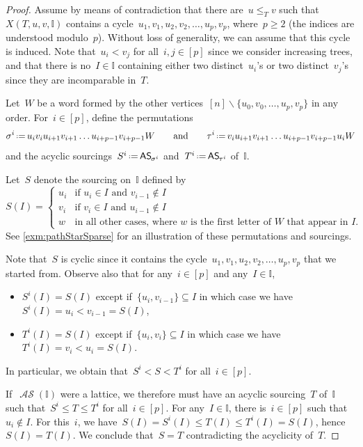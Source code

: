\documentclass{amsart}
\theoremstyle{definition}
\newcommand{\ssm}{\smallsetminus} %
\newcommand{\eqdef}{\mbox{\,\raisebox{0.2ex}{\scriptsize\ensuremath{\mathrm:}}\ensuremath{=}\,}} %
\newcommand{\mymap}[2]{\mathsf{#1}_{\hspace{-.7pt}#2}}
\DeclareMathOperator{\ASour}{\mathcal{AS}}  %
\newcommand{\asour}[1]{\mymap{AS}{#1}}  %
\newcommand{\II}{\mathbb I} %
\begin{document}
\begin{proof}
Assume by means of contradiction that there are~$u \le_T v$ such that~$X(T,u,v,\II)$ contains a cycle~$u_1, v_1, u_2, v_2, \dots, u_p, v_p$, where~$p \ge 2$ (the indices are understood modulo~$p$).
Without loss of generality, we can assume that this cycle is induced.
Note that~$u_i < v_j$ for all~$i,j \in [p]$ since we consider increasing trees, and that there is no~$I \in \II$ containing either two distinct~$u_i$'s or two distinct~$v_j$'s since they are incomparable in~$T$.

Let~$W$ be a word formed by the other vertices~$[n] \ssm \{u_0, v_0, \dots, u_p, v_p\}$ in any order.
For~$i \in [p]$, define the permutations
\[
\sigma^i \eqdef u_i v_i u_{i+1} v_{i+1} \dots u_{i+p-1} v_{i+p-1} W
\qquad\text{and}\qquad
\tau^i \eqdef v_i u_{i+1} v_{i+1} \dots u_{i+p-1} v_{i+p-1} u_i W
\]
and the acyclic sourcings~$S^i \eqdef \asour{\sigma^i}$ and~$T^i \eqdef \asour{\tau^i}$ of~$\II$.

Let~$S$ denote the sourcing on~$\II$ defined by
\[
S(I) = 
\begin{cases}
	u_i & \text{if~$u_i \in I$ and~$v_{i-1} \notin I$} \\
	v_i & \text{if~$v_i \in I$ and~$u_{i-1} \notin I$} \\
	w & \text{in all other cases, where~$w$ is the first letter of~$W$ that appear in~$I$}.
\end{cases}
\]
See \cref{exm:pathStarSparse} for an illustration of these permutations and sourcings.

Note that~$S$ is cyclic since it contains the cycle~$u_1, v_1, u_2, v_2, \dots, u_p, v_p$ that we started from.
Observe also that for any~$i \in [p]$ and any~$I \in \II$,
\begin{itemize}
\item $S^i(I) = S(I)$ except if~$\{u_i, v_{i-1}\} \subseteq I$ in which case we have~$S^i(I) = u_i < v_{i-1} = S(I)$,
\item $T^i(I) = S(I)$ except if~$\{u_i, v_i\} \subseteq I$ in which case we have~$T^i(I) = v_i < u_i = S(I)$.
\end{itemize}
In particular, we obtain that~$S^i < S < T^i$ for all~$i \in [p]$.

If~$\ASour(\II)$ were a lattice, we therefore must have an acyclic sourcing~$T$ of~$\II$ such that~$S^i \le T \le T^i$ for all~$i \in [p]$.
For any~$I \in \II$, there is~$i \in [p]$ such that~$u_i \notin I$.
For this~$i$, we have~$S(I) = S^i(I) \le T(I) \le T^i(I) = S(I)$, hence~$S(I) = T(I)$.
We conclude that~$S = T$ contradicting the acyclicity of~$T$.
\end{proof}
\end{document}
